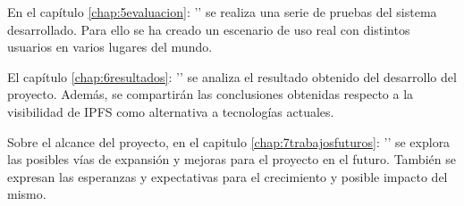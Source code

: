 En el capítulo \ref{chap:5evaluacion}: '' se realiza una
serie de pruebas del sistema desarrollado. Para ello se ha creado un escenario de uso real con distintos usuarios en varios lugares del mundo.

El capítulo \ref{chap:6resultados}: '' se analiza el resultado obtenido del desarrollo del proyecto. Además, se 
compartirán las conclusiones obtenidas respecto a la visibilidad de IPFS como alternativa a tecnologías actuales.

Sobre el alcance del proyecto, en el capitulo \ref{chap:7trabajosfuturos}: '' se explora las posibles vías de expansión y mejoras para el proyecto en el futuro.
También se expresan las esperanzas y expectativas para el crecimiento y posible impacto del mismo.
